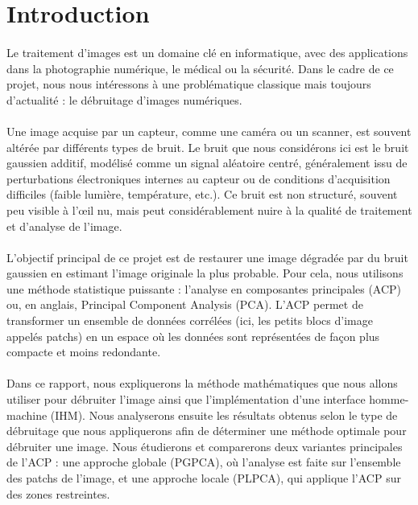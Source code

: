 \section{Introduction} 

\paragraph{}
Le traitement d’images est un domaine clé en informatique, avec des applications dans la photographie numérique, le médical ou la sécurité. Dans le cadre de ce projet, nous nous intéressons à une problématique classique mais toujours d’actualité : le débruitage d’images numériques.

\paragraph{}
Une image acquise par un capteur, comme une caméra ou un scanner, est souvent altérée par différents types de bruit. Le bruit que nous considérons ici est le bruit gaussien additif, modélisé comme un signal aléatoire centré, généralement issu de perturbations électroniques internes au capteur ou de conditions d’acquisition difficiles (faible lumière, température, etc.). Ce bruit est non structuré, souvent peu visible à l’œil nu, mais peut considérablement nuire à la qualité de traitement et d’analyse de l’image.

\paragraph{}
L’objectif principal de ce projet est de restaurer une image dégradée par du bruit gaussien en estimant l’image originale la plus probable. Pour cela, nous utilisons une méthode statistique puissante : l’analyse en composantes principales (ACP) ou, en anglais, Principal Component Analysis (PCA). L’ACP permet de transformer un ensemble de données corrélées (ici, les petits blocs d’image appelés patchs) en un espace où les données sont représentées de façon plus compacte et moins redondante.

\paragraph{}
Dans ce rapport, nous expliquerons la méthode mathématiques que nous allons utiliser pour débruiter l'image ainsi que l'implémentation d'une interface homme-machine (IHM). Nous analyserons ensuite les résultats obtenus selon le type de débruitage que nous appliquerons afin de déterminer une méthode optimale pour débruiter une image.
Nous étudierons et comparerons deux variantes principales de l'ACP : une approche globale (PGPCA), où l’analyse est faite sur l’ensemble des patchs de l’image, et une approche locale (PLPCA), qui applique l’ACP sur des zones restreintes.